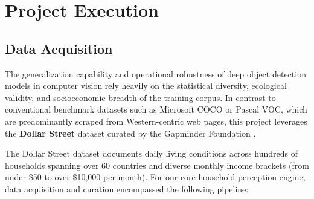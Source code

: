 \chapter{Project Execution}
\label{chap:project_execution}

\section{Data Acquisition}
\label{sec:data_acquisition}

The generalization capability and operational robustness of deep object detection models in computer vision rely heavily on the statistical diversity, ecological validity, and socioeconomic breadth of the training corpus. In contrast to conventional benchmark datasets such as Microsoft COCO or Pascal VOC, which are predominantly scraped from Western-centric web pages, this project leverages the \textbf{Dollar Street} dataset curated by the Gapminder Foundation \cite{rojas2021dollar}.

The Dollar Street dataset documents daily living conditions across hundreds of households spanning over 60 countries and diverse monthly income brackets (from under \$50 to over \$10,000 per month). For our core household perception engine, data acquisition and curation encompassed the following pipeline:


